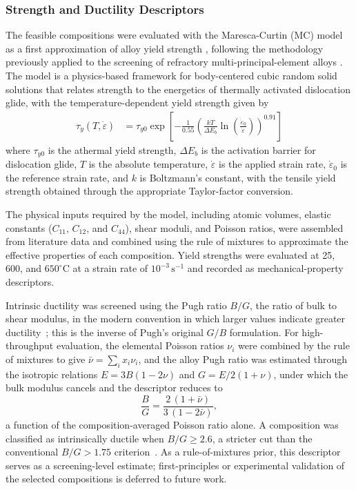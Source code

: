 \subsubsection{Strength and Ductility Descriptors}
The feasible compositions were evaluated with the Maresca-Curtin (MC)
model as a first approximation of alloy yield strength
\cite{maresca2020mechanistic}, following the methodology previously applied
to the screening of refractory multi-principal-element alloys
\cite{vela2023data}. The model is a physics-based framework for
body-centered cubic random solid solutions that relates strength to the
energetics of thermally activated dislocation glide, with the
temperature-dependent yield strength given by
\begin{equation}
\begin{aligned}
\tau_y(T,\dot{\varepsilon})
&= \tau_{y0}
\exp\!\left[
-\frac{1}{0.55}
\left(
\frac{kT}{\Delta E_b}
\ln\!\left(\frac{\dot{\varepsilon}_0}{\dot{\varepsilon}}\right)
\right)^{0.91}
\right]
\end{aligned}
\label{eq:yield_stress}
\end{equation}
where $\tau_{y0}$ is the athermal yield strength, $\Delta E_b$ is the
activation barrier for dislocation glide, $T$ is the absolute temperature,
$\dot{\varepsilon}$ is the applied strain rate, $\dot{\varepsilon}_0$ is the
reference strain rate, and $k$ is Boltzmann's constant, with the tensile
yield strength obtained through the appropriate Taylor-factor conversion.

The physical inputs required by the model, including atomic volumes, elastic
constants ($C_{11}$, $C_{12}$, and $C_{44}$), shear moduli, and Poisson
ratios, were assembled from literature data and combined using the rule of
mixtures to approximate the effective properties of each composition. Yield
strengths were evaluated at 25, 600, and $650^{\circ}\mathrm{C}$ at a strain
rate of $10^{-3}\,\mathrm{s}^{-1}$ and recorded as mechanical-property
descriptors.

Intrinsic ductility was screened using the Pugh ratio \(B/G\), the ratio of
bulk to shear modulus, in the modern convention in which larger values
indicate greater ductility~\cite{pugh1954,singh2023ductility}; this is the
inverse of Pugh's original \(G/B\) formulation. For high-throughput
evaluation, the elemental Poisson ratios \(\nu_i\) were combined by the rule
of mixtures to give \(\bar{\nu}=\sum_i x_i \nu_i\), and the alloy Pugh ratio
was estimated through the isotropic relations \(E=3B(1-2\nu)\) and
\(G=E/2(1+\nu)\), under which the bulk modulus cancels and the descriptor
reduces to
\begin{equation}
\frac{B}{G}=\frac{2\,(1+\bar{\nu})}{3\,(1-2\bar{\nu})},
\label{eq:pugh}
\end{equation}
a function of the composition-averaged Poisson ratio alone. A composition was
classified as intrinsically ductile when \(B/G \ge 2.6\), a stricter cut than
the conventional \(B/G > 1.75\) criterion~\cite{singh2023ductility}. As a
rule-of-mixtures prior, this descriptor serves as a screening-level estimate;
first-principles or experimental validation of the selected compositions is
deferred to future work.


